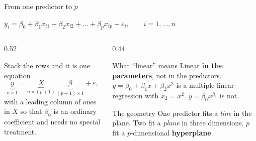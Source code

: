 \documentclass[aspectratio=169]{beamer}
\begin{document}
\begin{frame}[shrink=6]{From one predictor to $p$}
  \begin{exampleblock}{}
    \centering\large
    $y_i = \beta_0 + \beta_1 x_{i1} + \beta_2 x_{i2} + \dots +
     \beta_p x_{ip} + \varepsilon_i,
     \qquad i = 1,\dots,n$
  \end{exampleblock}
  \vspace{0.3em}
  \begin{columns}[T]
    \begin{column}{0.52\textwidth}
      \begin{block}{Stack the rows and it is one equation}
        \[
          \underbrace{y}_{n\times 1} =
          \underbrace{X}_{n\times(p+1)}\,
          \underbrace{\beta}_{(p+1)\times 1} + \varepsilon,
        \]
        with a leading column of ones in $X$ so that $\beta_0$ is an ordinary
        coefficient and needs no special treatment.
      \end{block}
    \end{column}
    \begin{column}{0.44\textwidth}
      \begin{block}{What ``linear'' means}
        \small Linear \textbf{in the parameters}, not in the predictors.
        $y = \beta_0 + \beta_1 x + \beta_2 x^2$ is a multiple linear
        regression with $x_2 = x^2$. $y = \beta_0 x^{\beta_1}$ is not.
      \end{block}
      \begin{alertblock}{The geometry}
        \small One predictor fits a \emph{line} in the plane. Two fit a
        \emph{plane} in three dimensions. $p$ fit a $p$-dimensional
        \textbf{hyperplane}.
      \end{alertblock}
    \end{column}
  \end{columns}
\end{frame}
\end{document}
